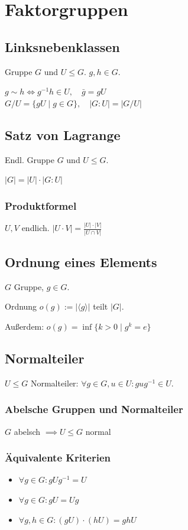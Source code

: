 \section*{Faktorgruppen}

\subsection*{Linksnebenklassen}
Gruppe $G$ und $U\le G$. $g,h\in G$.

$ g \sim h \iff g^{-1}h\in U,\quad \bar g = gU$\\
$ G/U = \{gU \mid g \in G \}, \quad |G:U| = |G/U| $

\subsection*{Satz von Lagrange}
Endl. Gruppe $G$ und $U \le G$.

$|G| = |U|\cdot|G:U|$

\subsubsection*{Produktformel}
$U,V$ endlich.
$|U \cdot V| = \frac{|U| \cdot |V|}{|U \cap V|}$

\subsection*{Ordnung eines Elements}
$G$ Gruppe, $g\in G$.

Ordnung $o(g):=|\langle g \rangle|$ teilt $|G|$.

Außerdem: $o(g)=\inf\{k>0 \mid g^k = e\}$

\subsection*{Normalteiler}
$U \le G$ Normalteiler: $\forall g\in G, u\in U: gug^{-1}\in U$.

\subsubsection*{Abelsche Gruppen und Normalteiler}
$G$ abelsch $\implies U \le G$ normal

\subsubsection*{Äquivalente Kriterien}
\begin{itemize}
	\item $\forall g\in G: gUg^{-1} = U$
	\item $\forall g \in G: gU = Ug$
	\item $\forall g,h\in G: (gU) \cdot (hU) = ghU$
\end{itemize}

